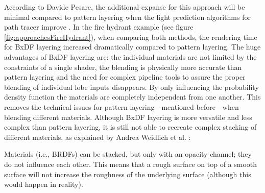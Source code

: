 	According to Davide Pesare, the additional expanse for this approach will be minimal compared to pattern layering when the light prediction algorithms for path tracer improve \cite{pesare2017material}. In the fire hydrant example (see figure \ref{fig:approachesFireHydrant}), when comparing both methods, the rendering time for BxDF layering increased dramatically compared to pattern layering. The huge advantages of BxDF layering are: the individual materials are not limited by the constraints of a single shader, the blending is physically more accurate than pattern layering and the need for complex pipeline tools to assure the proper blending of individual lobe inputs disappears. By only influencing the probability density function the materials are completely independent from one another. This removes the technical issues for pattern layering---mentioned before---when blending different materials. Although BxDF layering is more versatile and less complex than pattern layering, it is still not able to recreate complex stacking of different materials, as explained by Andrea Weidlich et al. \cite[p.\,9]{weidlich2011thinking}:
		
	\begin{itquote}
		Materials (i.e., BRDFs) can be stacked, but only with an opacity channel; they do not influence each other. This means that a rough surface on top of a smooth surface will not increase the roughness of the underlying surface (although this would happen in reality). 
	\end{itquote} %

